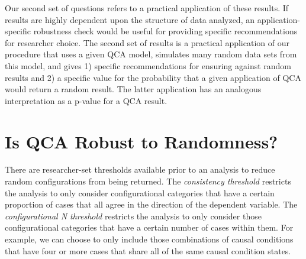 \documentclass[12pt]{article}
\begin{document}
{Our second set of questions refers to a practical application of these results. If results are highly dependent upon the structure of data analyzed, an application-specific robustness check would be useful for providing specific recommendations for researcher choice. The second set of results is a practical application of our procedure that uses a given QCA model, simulates many random data sets from this model, and gives 1) specific recommendations for ensuring against random results and 2) a specific value for the probability that a given application of QCA would return a random result. The latter application has an analogous interpretation as a p-value for a QCA result. 






\section{Is QCA Robust to Randomness?}


There are researcher-set thresholds available prior to an analysis to reduce random configurations from being returned. The {\it{consistency threshold}} restricts the analysis to only consider configurational categories that have a certain proportion of cases that all agree in the direction of the dependent variable. The {\it{configurational N threshold}} restricts the analysis to only consider those configurational categories that have a certain number of cases within them. For example, we can choose to only include those combinations of causal conditions that have four or more cases that share all of the same causal condition states.

}
\end{document}
